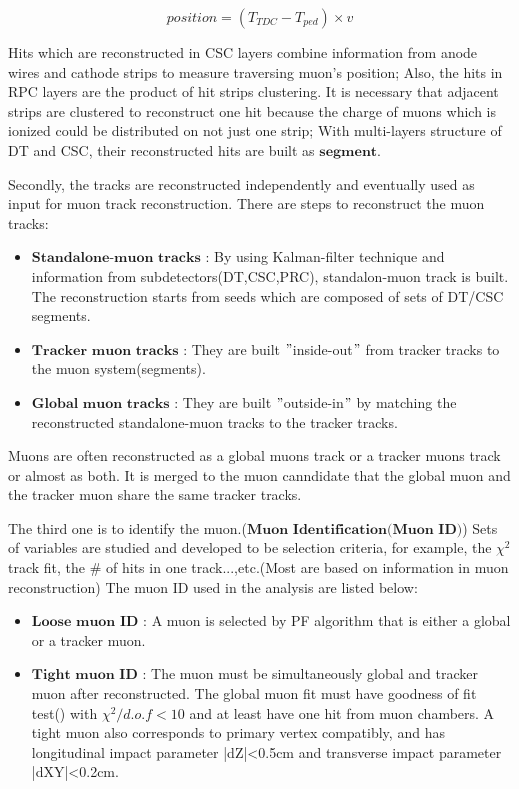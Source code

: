 			\begin{equation}
			position = (T_{TDC} - T_{ped}) \times v
			\label{eq:MuReco_1}
			\end{equation}
			\FloatBarrier

			Hits which are reconstructed in CSC layers combine information from anode wires and cathode strips to measure traversing muon's position; Also, the hits in RPC layers are the product of hit strips clustering. It is necessary that adjacent strips are clustered to reconstruct one hit because the charge of muons which is ionized could be distributed on not just one strip; With multi-layers structure of DT and CSC, their reconstructed hits are built as $\textbf{segment}$.

			Secondly, the tracks are reconstructed independently and eventually used as input for muon track reconstruction. There are steps to reconstruct the muon tracks:

			\begin{itemize}
				\item $\textbf{Standalone-muon tracks}$ : By using Kalman-filter technique\cite{Fruhwirth:1987fm} and information from subdetectors(DT,CSC,PRC), standalon-muon track is built. The reconstruction starts from seeds which are composed of sets of DT/CSC segments.
				\item $\textbf{Tracker muon tracks}$ : They are built $"$inside-out$"$ from tracker tracks to the muon system(segments). 
				\item $\textbf{Global muon tracks}$ : They are built $"$outside-in$"$ by matching the reconstructed standalone-muon tracks to the tracker tracks.
			\label{PhysObj:itm:muon_track_reco}
			\end{itemize}

			Muons are often reconstructed as a global muons track or a tracker muons track or almost as both. It is merged to the muon canndidate that the global muon and the tracker muon share the same tracker tracks.

			The third one is to identify the muon.($\textbf{Muon Identification}$$\textbf{(Muon ID)}$) Sets of variables are studied and developed to be selection criteria, for example, the $\chi^2$ track fit, the $\#$ of hits in one track...,etc.(Most are based on information in muon reconstruction) The muon ID used in the analysis are listed below:

			\begin{itemize}
				\item $\textbf{Loose muon ID}$ : A muon is selected by PF algorithm that is either a global or a tracker muon.
				\item $\textbf{Tight muon ID}$ : The muon must be simultaneously global and tracker muon after reconstructed. The global muon fit must have goodness of fit test() with $\chi^2/d.o.f < 10$ and at least have one hit from muon chambers. A tight muon also corresponds to primary vertex compatibly, and has longitudinal impact parameter |dZ|<0.5cm and transverse impact parameter |dXY|<0.2cm.
			\label{PhysObj:itm:muon_ID}
			\end{itemize}

